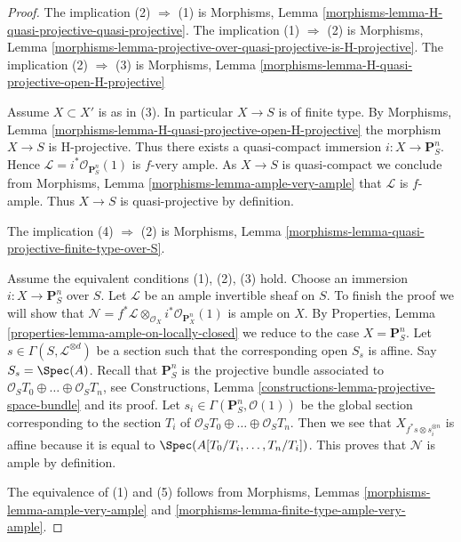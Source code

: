 \begin{proof}
The implication (2) $\Rightarrow$ (1) is
Morphisms, Lemma \ref{morphisms-lemma-H-quasi-projective-quasi-projective}.
The implication (1) $\Rightarrow$ (2) is
Morphisms, Lemma
\ref{morphisms-lemma-projective-over-quasi-projective-is-H-projective}.
The implication (2) $\Rightarrow$ (3) is
Morphisms, Lemma \ref{morphisms-lemma-H-quasi-projective-open-H-projective}

\medskip\noindent
Assume $X \subset X'$ is as in (3). In particular $X \to S$ is
of finite type. By
Morphisms, Lemma \ref{morphisms-lemma-H-quasi-projective-open-H-projective}
the morphism $X \to S$ is H-projective.
Thus there exists a quasi-compact immersion $i : X \to \mathbf{P}^n_S$.
Hence $\mathcal{L} = i^*\mathcal{O}_{\mathbf{P}^n_S}(1)$
is $f$-very ample. As $X \to S$ is quasi-compact we conclude from
Morphisms, Lemma \ref{morphisms-lemma-ample-very-ample}
that $\mathcal{L}$ is $f$-ample. Thus $X \to S$ is quasi-projective
by definition.

\medskip\noindent
The implication (4) $\Rightarrow$ (2) is
Morphisms, Lemma \ref{morphisms-lemma-quasi-projective-finite-type-over-S}.

\medskip\noindent
Assume the equivalent conditions (1), (2), (3) hold.
Choose an immersion $i : X \to \mathbf{P}^n_S$ over $S$.
Let $\mathcal{L}$ be an ample invertible sheaf on $S$. To finish the
proof we will show that
$\mathcal{N} =
f^*\mathcal{L} \otimes_{\mathcal{O}_X} i^*\mathcal{O}_{\mathbf{P}^n_X}(1)$
is ample on $X$. By
Properties, Lemma \ref{properties-lemma-ample-on-locally-closed}
we reduce to the case $X = \mathbf{P}^n_S$. Let
$s \in \Gamma(S, \mathcal{L}^{\otimes d})$ be a section
such that the corresponding open $S_s$ is affine.
Say $S_s = \Spec(A)$.
Recall that $\mathbf{P}^n_S$ is the projective bundle
associated to $\mathcal{O}_S T_0 \oplus \ldots \oplus \mathcal{O}_S T_n$, see
Constructions, Lemma \ref{constructions-lemma-projective-space-bundle}
and its proof.
Let $s_i \in \Gamma(\mathbf{P}^n_S, \mathcal{O}(1))$
be the global section corresponding to the section $T_i$
of $\mathcal{O}_S T_0 \oplus \ldots \oplus \mathcal{O}_S T_n$.
Then we see that $X_{f^*s \otimes s_i^{\otimes n}}$ is affine
because it is equal to $\Spec(A[T_0/T_i, \ldots, T_n/T_i])$.
This proves that $\mathcal{N}$ is ample by definition.

\medskip\noindent
The equivalence of (1) and (5) follows from
Morphisms, Lemmas \ref{morphisms-lemma-ample-very-ample} and
\ref{morphisms-lemma-finite-type-ample-very-ample}.
\end{proof}

